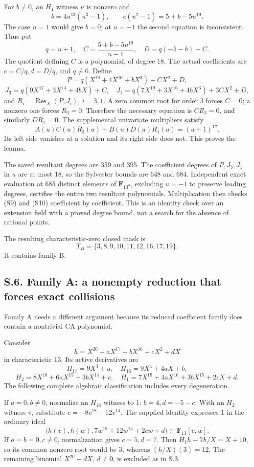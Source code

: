 \documentclass[
  british,
  10pt,
]{article}
\newcounter{none} %
\begin{document}
For \(b\ne0\), an \(H_4\) witness \(u\) is nonzero and \[
b=4u^{13}(u^3-1),\qquad c(u^2-1)=5+b-5u^{19}.
\] The case \(u=1\) would give \(b=0\); at \(u=-1\) the second equation
is inconsistent. Thus put \[
q=u+1,\quad C=\frac{5+b-5u^{19}}{u-1},\quad D=q(-5-b)-C.
\] The quotient defining \(C\) is a polynomial, of degree 18. The actual
coefficients are \(c=C/q,d=D/q\), and \(q\ne0\). Define \[
P=q(X^{19}+4X^{16}+bX^3)+CX^2+D,
\] \[
J_3=q(9X^{17}+3X^{14}+4bX)+C,\quad
J_1=q(7X^{19}+3X^{16}+4bX^3)+3CX^2+D,
\] and \(R_i=\operatorname{Res}_X(P,J_i)\), \(i=3,1\). A zero common
root for order 3 forces \(C=0\); a nonzero one forces \(R_3=0\).
Therefore the necessary equation is \(CR_3=0\), and similarly
\(DR_1=0\). The supplemental univariate multipliers satisfy \[
A(u)C(u)R_3(u)+B(u)D(u)R_1(u)=(u+1)^{17}.
\tag{S10}
\] Its left side vanishes at a solution and its right side does not.
This proves the lemma.

The saved resultant degrees are 359 and 395. The coefficient degrees of
\(P,J_3,J_1\) in \(u\) are at most 18, so the Sylvester bounds are 648
and 684. Independent exact evaluation at 685 distinct elements of
\(\mathbf F_{13^3}\), excluding \(u=-1\) to preserve leading degrees,
certifies the entire two resultant polynomials. Multiplication then
checks (S9) and (S10) coefficient by coefficient. This is an identity
check over an extension field with a proved degree bound, not a search
for the absence of rational points.

The resulting characteristic-zero closed mask is \[
T_B=\{3,8,9,10,11,12,16,17,19\}.
\] It contains family B.

\subsection{S.6. Family A: a nonempty reduction that forces exact
collisions}\label{s.6.-family-a-a-nonempty-reduction-that-forces-exact-collisions}

Family A needs a different argument because its reduced coefficient
family does contain a nontrivial CA polynomial.

Consider \[
h=X^{20}+aX^{17}+bX^{16}+cX^2+dX
\] in characteristic 13. Its active derivatives are \[
H_{17}=9X^3+a,\quad H_{16}=9X^4+4aX+b,
\] \[
H_2=8X^{18}+6aX^{15}+3bX^{14}+c,\quad
H_1=7X^{19}+4aX^{16}+3bX^{15}+2cX+d.
\] The following complete algebraic classification includes every
degeneration.

If \(a=0,b\ne0\), normalize an \(H_{16}\) witness to 1: \(b=4,d=-5-c\).
With an \(H_2\) witness \(v\), substitute \(c=-8v^{18}-12v^{14}\). The
supplied identity expresses 1 in the ordinary ideal \[
\bigl(h(v),h(w),7w^{19}+12w^{15}+2cw+d\bigr)
\subset\mathbf F_{13}[v,w].
\tag{S11}
\] If \(a=b=0,c\ne0\), normalization gives \(c=5,d=7\). Then
\(H_1h-7h/X=X+10\), so its common nonzero root would be 3, whereas
\((h/X)(3)=12\). The remaining binomial \(X^{20}+dX\), \(d\ne0\), is
excluded as in S.3.
\end{document}
